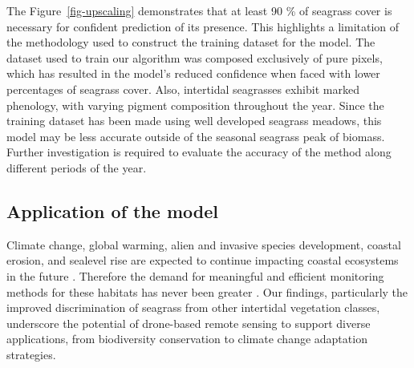 \documentclass[
  number]{elsarticle}
\begin{document}
The Figure~\ref{fig-upscaling} demonstrates that at least 90 \% of
seagrass cover is necessary for confident prediction of its presence.
This highlights a limitation of the methodology used to construct the
training dataset for the model. The dataset used to train our algorithm
was composed exclusively of pure pixels, which has resulted in the
model's reduced confidence when faced with lower percentages of seagrass
cover. Also, intertidal seagrasses exhibit marked phenology, with
varying pigment composition throughout the year\citetext{\citealp[
]{bargain2013seasonal}; \citealp{legare2022remote}}. Since the training
dataset has been made using well developed seagrass meadows, this model
may be less accurate outside of the seasonal seagrass peak of biomass.
Further investigation is required to evaluate the accuracy of the method
along different periods of the year.

\subsection{Application of the model}\label{application-of-the-model}

Climate change, global warming, alien and invasive species development,
coastal erosion, and sealevel rise are expected to continue impacting
coastal ecosystems in the future
\citetext{\citealp{SCHIBALSKI2022101414}; \citealp[
]{holon2018predictive}; \citealp{marquet2024global}}. Therefore the
demand for meaningful and efficient monitoring methods for these
habitats has never been greater \citetext{\citealp[
]{muller2018satellite}; \citealp[
]{villalobos2023remote}; \citealp{oiry2021using}}. Our findings,
particularly the improved discrimination of seagrass from other
intertidal vegetation classes, underscore the potential of drone-based
remote sensing to support diverse applications, from biodiversity
conservation to climate change adaptation strategies.
\end{document}
